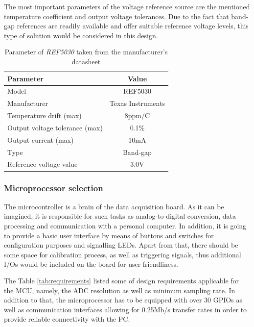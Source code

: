\documentclass[12pt,a4paper]{article}
\begin{document}
The most important parameters of the voltage reference source are the mentioned temperature coefficient and output voltage tolerances. Due to the fact that band-gap references   are readily available and offer suitable reference voltage levels, this type of solution would be considered in this design.\par

\begin{table}[ht!]
\begin{tabular}{|l|c|}
\hline
\textbf{Parameter}	& \textbf{Value} 	\\ \hline
Model  				& REF5030       \\ \hline
Manufacturer    	& Texas Instruments	\\ \hline
Temperature drift (max)       	&  8ppm/\degree C 	\\\hline
Output voltage tolerance (max)     &  0.1\%			\\ \hline
Output current (max)       & 10mA\\ \hline
Type         &  Band-gap				\\ \hline
Reference voltage value		&  3.0V		\\ \hline

\end{tabular}
\caption{Parameter of \textit{REF5030} taken from the manufacturer's datasheet \cite{ref5030_params}}
\label{tab:fer5030_params}
\end{table}

\subsubsection{Microprocessor selection}
The microcontroller is a brain of the data acquisition board. As it can be imagined, it is responsible for such tasks as analog-to-digital conversion, data processing and communication with a personal computer. In addition, it is going to provide a basic user interface by means of buttons and switches for configuration purposes and signalling LEDs. Apart from that, there should be some space for calibration process, as well as triggering signals, thus additional I/Os would be included on the board for user-friendliness.
\par

The Table \ref{tab:requirements} listed some of design requirements applicable for the MCU, namely, the ADC resolution as well as minimum sampling rate. In addition to that, the microprocessor has to be equipped with over 30 GPIOs as well as communication interfaces allowing for 0.25Mb/s transfer rates in order to provide reliable connectivity with the PC.
\end{document}
